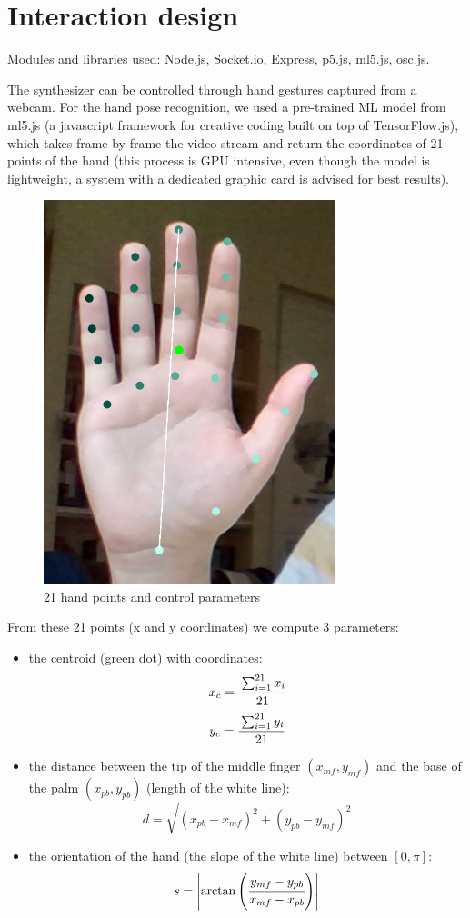 \documentclass[a4paper,12pt]{report}
\begin{document}
\section*{Interaction design}

Modules and libraries used: \href{https://nodejs.org/en/}{Node.js}, \href{https://socket.io/}{Socket.io}, \href{https://expressjs.com/}{Express}, \href{https://p5js.org/}{p5.js}, \href{https://ml5js.org/}{ml5.js}, \href{https://github.com/colinbdclark/osc.js/}{osc.js}.

The synthesizer can be controlled through hand gestures captured from a webcam. For the hand pose recognition, we used a pre-trained ML model from ml5.js (a javascript framework for creative coding built on top of TensorFlow.js), which takes frame by frame the video stream and return the coordinates of 21 points of the hand (this process is GPU intensive, even though the model is lightweight, a system with a dedicated graphic card is advised for best results). 

\begin{figure}[h]
\centering
\includegraphics[scale=0.8]{hand.png}
\caption{21 hand points and control parameters}
\end{figure}

From these 21 points (x and y coordinates) we compute 3 parameters:
\begin{itemize}
	\item the centroid (green dot) with coordinates:
	\[x_c = \cfrac{\sum_{i = 1}^{21}x_i}{21}\]
	\[y_c = \cfrac{\sum_{i = 1}^{21}y_i}{21}\]
	\item the distance between the tip of the middle finger $(x_{mf}, y_{mf})$ and the base of the palm $(x_{pb}, y_{pb})$ (length of the white line): 
	\[d = \sqrt{(x_{pb} - x_{mf})^2 + (y_{pb} - y_{mf})^2}\]
	\item the orientation of the hand (the slope of the white line) between $[0, \pi]$:
	\[s = \left\lvert\arctan{\left(\cfrac {y_{mf} - y_{pb}}{x_{mf} - x_{pb}}\right)}\right\rvert \]
\end{itemize}  
\end{document}
